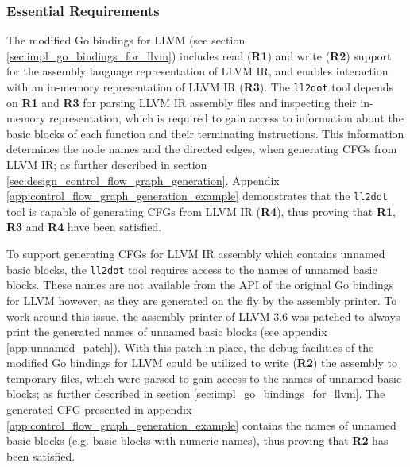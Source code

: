 
\subsubsection{Essential Requirements}
\label{sec:eval_llvm_ir_library_essential_requirements}


The modified Go bindings for LLVM (see section \ref{sec:impl_go_bindings_for_llvm}) includes read (\textbf{R1}) and write (\textbf{R2}) support for the assembly language representation of LLVM IR, and enables interaction with an in-memory representation of LLVM IR (\textbf{R3}). The \texttt{ll2dot} tool depends on \textbf{R1} and \textbf{R3} for parsing LLVM IR assembly files and inspecting their in-memory representation, which is required to gain access to information about the basic blocks of each function and their terminating instructions. This information determines the node names and the directed edges, when generating CFGs from LLVM IR; as further described in section \ref{sec:design_control_flow_graph_generation}. Appendix \ref{app:control_flow_graph_generation_example} demonstrates that the \texttt{ll2dot} tool is capable of generating CFGs from LLVM IR (\textbf{R4}), thus proving that \textbf{R1}, \textbf{R3} and \textbf{R4} have been satisfied.


To support generating CFGs for LLVM IR assembly which contains unnamed basic blocks, the \texttt{ll2dot} tool requires access to the names of unnamed basic blocks. These names are not available from the API of the original Go bindings for LLVM however, as they are generated on the fly by the assembly printer. To work around this issue, the assembly printer of LLVM 3.6 was patched to always print the generated names of unnamed basic blocks (see appendix \ref{app:unnamed_patch}). With this patch in place, the debug facilities of the modified Go bindings for LLVM could be utilized to write (\textbf{R2}) the assembly to temporary files, which were parsed to gain access to the names of unnamed basic blocks; as further described in section \ref{sec:impl_go_bindings_for_llvm}. The generated CFG presented in appendix \ref{app:control_flow_graph_generation_example} contains the names of unnamed basic blocks (e.g. basic blocks with numeric names), thus proving that \textbf{R2} has been satisfied.
